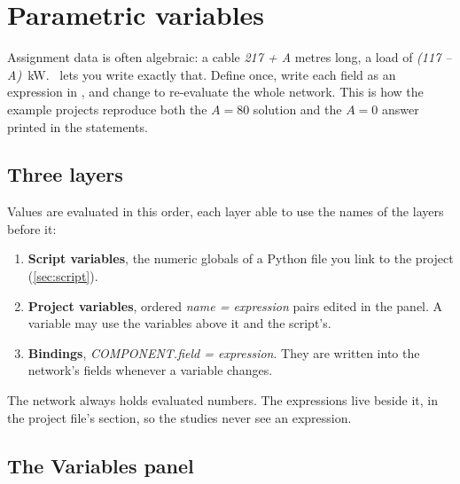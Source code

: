 \chapter{Parametric variables}\label{ch:parameters}

Assignment data is often algebraic: a cable \emph{217 + A} metres long, a load of
\emph{(117 -- A)}~kW. \app\ lets you write exactly that. Define  once, write each
field as an expression in , and change  to re-evaluate the whole network.
This is how the example projects reproduce both the $A=80$ solution and the $A=0$ answer
printed in the statements.

\section{Three layers}

Values are evaluated in this order, each layer able to use the names of the layers
before it:

\begin{enumerate}
  \item \textbf{Script variables}, the numeric globals of a Python file you link to the
    project (\cref{sec:script}).
  \item \textbf{Project variables}, ordered \emph{name = expression} pairs edited in the
     panel. A variable may use the variables above it and the script's.
  \item \textbf{Bindings}, \emph{COMPONENT.field = expression}. They are written into the
    network's fields whenever a variable changes.
\end{enumerate}

The network always holds evaluated numbers. The expressions live beside it, in the
project file's  section, so the studies never see an expression.

\section{The Variables panel}

